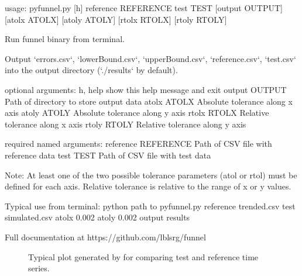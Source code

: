 \documentclass[letterpaper,10pt, openany,english]{sphinxmanual}
\let\sphinxpxdimen\pdfpxdimen\else\newdimen\sphinxpxdimen
\begin{document}
\begin{sphinxVerbatim}[commandchars=\\\{\}]
usage: pyfunnel.py [\PYGZhy{}h] \PYGZhy{}\PYGZhy{}reference REFERENCE \PYGZhy{}\PYGZhy{}test TEST [\PYGZhy{}\PYGZhy{}output OUTPUT]
                  [\PYGZhy{}\PYGZhy{}atolx ATOLX] [\PYGZhy{}\PYGZhy{}atoly ATOLY] [\PYGZhy{}\PYGZhy{}rtolx RTOLX]
                  [\PYGZhy{}\PYGZhy{}rtoly RTOLY]

Run funnel binary from terminal.

Output {}`errors.csv{}`, {}`lowerBound.csv{}`, {}`upperBound.csv{}`, {}`reference.csv{}`, {}`test.csv{}` into the output directory ({}`./results{}` by default).

optional arguments:
  \PYGZhy{}h, \PYGZhy{}\PYGZhy{}help            show this help message and exit
  \PYGZhy{}\PYGZhy{}output OUTPUT       Path of directory to store output data
  \PYGZhy{}\PYGZhy{}atolx ATOLX         Absolute tolerance along x axis
  \PYGZhy{}\PYGZhy{}atoly ATOLY         Absolute tolerance along y axis
  \PYGZhy{}\PYGZhy{}rtolx RTOLX         Relative tolerance along x axis
  \PYGZhy{}\PYGZhy{}rtoly RTOLY         Relative tolerance along y axis

required named arguments:
  \PYGZhy{}\PYGZhy{}reference REFERENCE
                        Path of CSV file with reference data
  \PYGZhy{}\PYGZhy{}test TEST           Path of CSV file with test data

Note: At least one of the two possible tolerance parameters (atol or rtol) must be defined for each axis.
Relative tolerance is relative to the range of x or y values.

Typical use from terminal:
\PYGZdl{} python \PYGZob{}path to pyfunnel.py\PYGZcb{} \PYGZhy{}\PYGZhy{}reference trended.csv \PYGZhy{}\PYGZhy{}test simulated.csv \PYGZhy{}\PYGZhy{}atolx 0.002 \PYGZhy{}\PYGZhy{}atoly 0.002 \PYGZhy{}\PYGZhy{}output results

Full documentation at https://github.com/lbl\PYGZhy{}srg/funnel
\end{sphinxVerbatim}

\begin{figure}[htbp]
\centering
\capstart

\noindent\sphinxincludegraphics[width=800\sphinxpxdimen]{{funnel_example}.pdf}
\caption{Typical plot generated by  for comparing test and reference time series.}\label{\detokenize{verification:id3}}\label{\detokenize{verification:fig-funnel-example}}\end{figure}
\end{document}
